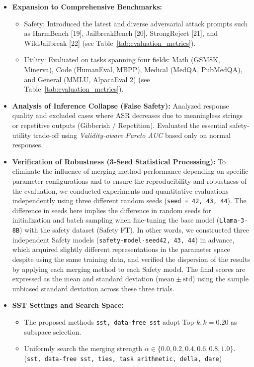 \documentclass{article}
\begin{document}
\begin{itemize}
    \item \textbf{Expansion to Comprehensive Benchmarks:}
    \begin{itemize}
        \item Safety:
        Introduced the latest and diverse adversarial attack prompts such as HarmBench [19], JailbreakBench [20], StrongReject [21], and WildJailbreak [22] (see Table~\ref{tab:evaluation_metrics}).
        \item Utility:
        Evaluated on tasks spanning four fields: Math (GSM8K, Minerva), Code (HumanEval, MBPP), Medical (MedQA, PubMedQA), and General (MMLU, AlpacaEval 2) (see Table~\ref{tab:evaluation_metrics}).
    \end{itemize}
    \item \textbf{Analysis of Inference Collapse (False Safety):}
    Analyzed response quality and excluded cases where ASR decreases due to meaningless strings or repetitive outputs (Gibberish / Repetition). Evaluated the essential safety-utility trade-off using \textit{Validity-aware Pareto AUC} based only on normal responses.
    \item \textbf{Verification of Robustness (3-Seed Statistical Processing):}
    To eliminate the influence of merging method performance depending on specific parameter configurations and to ensure the reproducibility and robustness of the evaluation, we conducted experiments and quantitative evaluations independently using three different random seeds (\texttt{seed = 42, 43, 44}). The difference in seeds here implies the difference in random seeds for initialization and batch sampling when fine-tuning the base model (\texttt{Llama-3-8B}) with the safety dataset (Safety FT). In other words, we constructed three independent Safety models (\texttt{safety-model-seed42, 43, 44}) in advance, which acquired slightly different representations in the parameter space despite using the same training data, and verified the dispersion of the results by applying each merging method to each Safety model. The final scores are expressed as the mean and standard deviation ($\mathrm{mean} \pm \mathrm{std}$) using the sample unbiased standard deviation across these three trials.
    \item \textbf{SST Settings and Search Space:}
    \begin{itemize}
        \item The proposed methods \texttt{sst, data-free sst} adopt Top-$k, k=0.20$ as subspace selection.
        \item Uniformly search the merging strength $\alpha \in \{0.0, 0.2, 0.4, 0.6, 0.8, 1.0\}$. (\texttt{sst, data-free sst, ties, task arithmetic, della, dare})

\end{itemize}
\end{itemize}
\end{document}
